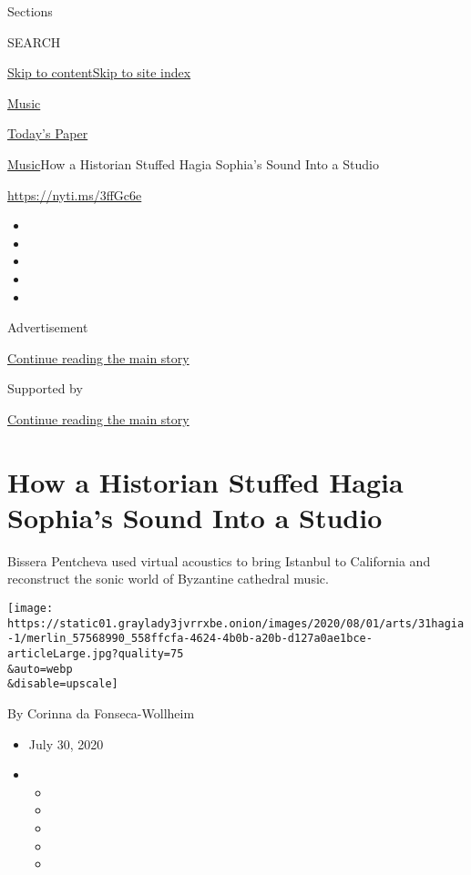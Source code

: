 Sections

SEARCH

\protect\hyperlink{site-content}{Skip to
content}\protect\hyperlink{site-index}{Skip to site index}

\href{https://www.nytimes3xbfgragh.onion/section/arts/music}{Music}

\href{https://myaccount.nytimes3xbfgragh.onion/auth/login?response_type=cookie\&client_id=vi}{}

\href{https://www.nytimes3xbfgragh.onion/section/todayspaper}{Today's
Paper}

\href{/section/arts/music}{Music}\textbar{}How a Historian Stuffed Hagia
Sophia's Sound Into a Studio

\url{https://nyti.ms/3ffGc6e}

\begin{itemize}
\item
\item
\item
\item
\item
\end{itemize}

Advertisement

\protect\hyperlink{after-top}{Continue reading the main story}

Supported by

\protect\hyperlink{after-sponsor}{Continue reading the main story}

\hypertarget{how-a-historian-stuffed-hagia-sophias-sound-into-a-studio}{%
\section{How a Historian Stuffed Hagia Sophia's Sound Into a
Studio}\label{how-a-historian-stuffed-hagia-sophias-sound-into-a-studio}}

Bissera Pentcheva used virtual acoustics to bring Istanbul to California
and reconstruct the sonic world of Byzantine cathedral music.

\texttt{[image: https://static01.graylady3jvrrxbe.onion/images/2020/08/01/arts/31hagia-1/merlin\_57568990\_558ffcfa-4624-4b0b-a20b-d127a0ae1bce-articleLarge.jpg?quality=75\\\&auto=webp\\\&disable=upscale]}

By Corinna da Fonseca-Wollheim

\begin{itemize}
\item
  July 30, 2020
\item
  \begin{itemize}
  \item
  \item
  \item
  \item
  \item
  \end{itemize}
\end{itemize}

